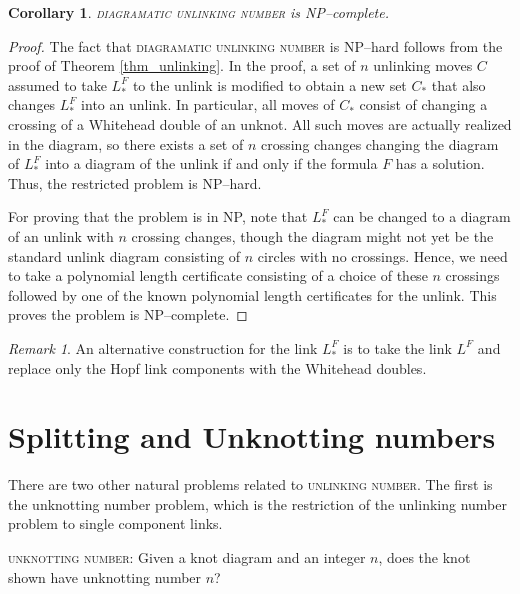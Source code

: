 \documentclass[12pt]{amsart}
\newtheorem{corr}[thm]{Corollary}
\theoremstyle{definition}
\theoremstyle{remark}
\newtheorem{rem}[thm]{Remark}
\begin{document}
\begin{corr}
\textsc{diagramatic unlinking number} is NP--complete.
\end{corr}
\begin{proof}
The fact that \textsc{diagramatic unlinking number} is NP--hard follows from the proof of Theorem \ref{thm_unlinking}.  In the proof, a set of $n$ unlinking moves $C$ assumed to take $L_*^F$ to the unlink is modified to obtain a new set $C_*$ that also changes $L_*^F$ into an unlink.  In particular, all moves of $C_*$ consist of changing a crossing of a Whitehead double of an unknot.  All such moves are actually realized in the diagram, so there exists a set of $n$ crossing changes changing the diagram of $L_*^F$ into a diagram of the unlink if and only if the formula $F$ has a solution.  Thus, the restricted problem is NP--hard.

For proving that the problem is in NP, note that $L_*^F$ can be changed to a diagram of an unlink with $n$ crossing changes, though the diagram might not yet be the standard unlink diagram consisting of $n$ circles with no crossings. Hence, we need to take a polynomial length certificate consisting of a choice of these $n$ crossings followed by one of the known polynomial length certificates for the unlink. This proves the problem is NP--complete.
\end{proof}

\begin{rem}
  An alternative construction for the link $L^F_*$ is to take the link $L^F$ and replace only the Hopf link components with the Whitehead doubles.


\end{rem}

\section{Splitting and Unknotting numbers}
\label{sec_splittingnum}

There are two other natural problems related to \textsc{unlinking number}. The first is the unknotting number problem, which is the restriction of the unlinking number problem to single component links.


\vspace{0.14in}
\textsc{unknotting number}: Given a knot diagram and an integer $n$, does the knot shown have unknotting number $n$?
\vspace{0.14in}
\end{document}
